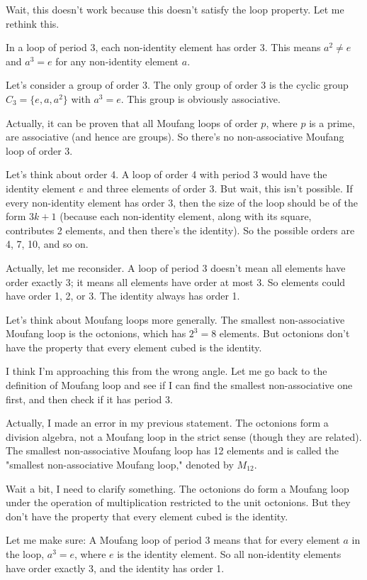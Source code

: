 \documentclass[12p]{article}
\newcounter{reasoningcounter}
\newenvironment{reasoning}[1][]
{\refstepcounter{reasoningcounter}%
\begin{tcolorbox}[
    title=Reasoning \thereasoningcounter: #1,
    colback=white, %
    colframe=gray,
    coltext=black, %
    fonttitle=\bfseries\normalsize,
    top=2mm,
    bottom=2mm,
    enlarge top initially by=5mm
]
\small
}
{\end{tcolorbox}}
\begin{document}
\begin{reasoning}
Wait, this doesn't work because this doesn't satisfy the loop property. Let me rethink this.

In a loop of period 3, each non-identity element has order 3. This means $a^2 \neq e$ and $a^3 = e$ for any non-identity element $a$.

Let's consider a group of order 3. The only group of order 3 is the cyclic group $C_3 = \{e, a, a^2\}$ with $a^3 = e$. This group is obviously associative.

Actually, it can be proven that all Moufang loops of order $p$, where $p$ is a prime, are associative (and hence are groups). So there's no non-associative Moufang loop of order 3.

Let's think about order 4. A loop of order 4 with period 3 would have the identity element $e$ and three elements of order 3. But wait, this isn't possible. If every non-identity element has order 3, then the size of the loop should be of the form $3k + 1$ (because each non-identity element, along with its square, contributes 2 elements, and then there's the identity). So the possible orders are 4, 7, 10, and so on.

Actually, let me reconsider. A loop of period 3 doesn't mean all elements have order exactly 3; it means all elements have order at most 3. So elements could have order 1, 2, or 3. The identity always has order 1.

Let's think about Moufang loops more generally. The smallest non-associative Moufang loop is the octonions, which has $2^3 = 8$ elements. But octonions don't have the property that every element cubed is the identity.

I think I'm approaching this from the wrong angle. Let me go back to the definition of Moufang loop and see if I can find the smallest non-associative one first, and then check if it has period 3.

Actually, I made an error in my previous statement. The octonions form a division algebra, not a Moufang loop in the strict sense (though they are related). The smallest non-associative Moufang loop has 12 elements and is called the "smallest non-associative Moufang loop," denoted by $M_{12}$.

Wait a bit, I need to clarify something. The octonions do form a Moufang loop under the operation of multiplication restricted to the unit octonions. But they don't have the property that every element cubed is the identity.

Let me make sure: A Moufang loop of period 3 means that for every element $a$ in the loop, $a^3 = e$, where $e$ is the identity element. So all non-identity elements have order exactly 3, and the identity has order 1.


\end{reasoning}
\end{document}
